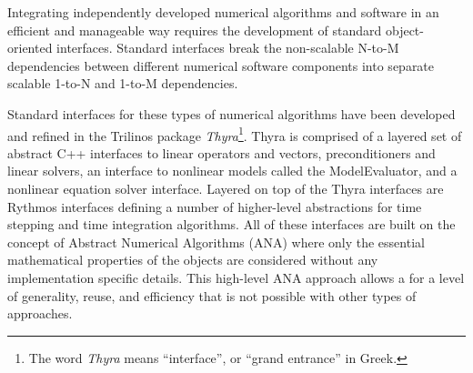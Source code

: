 \documentclass[pdf,ps2pdf,11pt]{SANDreport}
\begin{document}

Integrating independently developed numerical algorithms and software in an
efficient and manageable way requires the development of standard
object-oriented interfaces.  Standard interfaces break the non-scalable N-to-M
dependencies between different numerical software components into separate
scalable 1-to-N and 1-to-M dependencies.


Standard interfaces for these types of numerical algorithms have been developed
and refined in the Trilinos package {}\textit{Thyra}\footnote{The word
{}\textit{Thyra} means ``interface'', or ``grand entrance'' in Greek.}.  Thyra
is comprised of a layered set of abstract C++ interfaces to linear operators
and vectors, preconditioners and linear solvers, an interface to nonlinear
models called the ModelEvaluator, and a nonlinear equation solver interface.
Layered on top of the Thyra interfaces are Rythmos interfaces defining a
number of higher-level abstractions for time stepping and time integration
algorithms.  All of these interfaces are built on the concept of Abstract
Numerical Algorithms (ANA) where only the essential mathematical properties of
the objects are considered without any implementation specific details.  This
high-level ANA approach allows a for a level of generality, reuse, and
efficiency that is not possible with other types of approaches.
%
%
\end{document}
